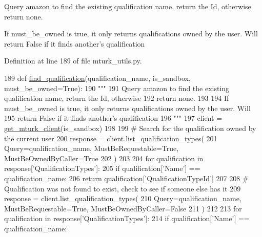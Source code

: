 \begin{DoxyVerb}Query amazon to find the existing qualification name, return the Id, otherwise
return none.

If must_be_owned is true, it only returns qualifications owned by the user. Will
return False if it finds another's qualification
\end{DoxyVerb}
 

Definition at line 189 of file mturk\+\_\+utils.\+py.


\begin{DoxyCode}
189 \textcolor{keyword}{def }\hyperlink{namespaceparlai_1_1mturk_1_1core_1_1mturk__utils_a54121023abc81124ba03cc50d5f23af3}{find\_qualification}(qualification\_name, is\_sandbox, must\_be\_owned=True):
190     \textcolor{stringliteral}{"""}
191 \textcolor{stringliteral}{    Query amazon to find the existing qualification name, return the Id, otherwise}
192 \textcolor{stringliteral}{    return none.}
193 \textcolor{stringliteral}{}
194 \textcolor{stringliteral}{    If must\_be\_owned is true, it only returns qualifications owned by the user. Will}
195 \textcolor{stringliteral}{    return False if it finds another's qualification}
196 \textcolor{stringliteral}{    """}
197     client = \hyperlink{namespaceparlai_1_1mturk_1_1core_1_1mturk__utils_a577e2527c04682284394b0951a090695}{get\_mturk\_client}(is\_sandbox)
198 
199     \textcolor{comment}{# Search for the qualification owned by the current user}
200     response = client.list\_qualification\_types(
201         Query=qualification\_name, MustBeRequestable=\textcolor{keyword}{True}, MustBeOwnedByCaller=\textcolor{keyword}{True}
202     )
203 
204     \textcolor{keywordflow}{for} qualification \textcolor{keywordflow}{in} response[\textcolor{stringliteral}{'QualificationTypes'}]:
205         \textcolor{keywordflow}{if} qualification[\textcolor{stringliteral}{'Name'}] == qualification\_name:
206             \textcolor{keywordflow}{return} qualification[\textcolor{stringliteral}{'QualificationTypeId'}]
207 
208     \textcolor{comment}{# Qualification was not found to exist, check to see if someone else has it}
209     response = client.list\_qualification\_types(
210         Query=qualification\_name, MustBeRequestable=\textcolor{keyword}{True}, MustBeOwnedByCaller=\textcolor{keyword}{False}
211     )
212 
213     \textcolor{keywordflow}{for} qualification \textcolor{keywordflow}{in} response[\textcolor{stringliteral}{'QualificationTypes'}]:
214         \textcolor{keywordflow}{if} qualification[\textcolor{stringliteral}{'Name'}] == qualification\_name:

\end{DoxyCode}
